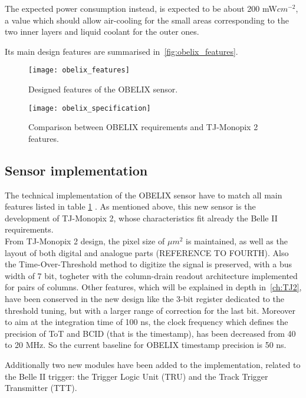 The expected power consumption instead, is expected to be about 200 mW$cm^{-2}$, a value which should allow air-cooling for the small areas corresponding to the two inner layers and liquid coolant for the outer ones. 

Its main design features are summarised in~\autoref{fig:obelix_features}.


\begin{figure}[h!]
\centering
\texttt{[image: obelix\_features]}
\caption{Designed features of the OBELIX sensor.}
\label{fig:obelix_features}
\end{figure}

\begin{figure}[h!]
\centering
\texttt{[image: obelix\_specification]}
\caption{Comparison between OBELIX requirements and TJ-Monopix 2 features.}
\label{fig:obelix_specification}
\end{figure}

\subsection{Sensor implementation}

The technical implementation of the OBELIX sensor have to match all main features listed in table \ref{fig:obelix_features} .
As mentioned above, this new sensor is the development of TJ-Monopix 2, whose characteristics fit already the Belle II requirements.\\

From TJ-Monopix 2 design, the pixel size of  $\mu m^{2}$ is maintained, as well as the layout of both digital and analogue parts (REFERENCE TO FOURTH). Also the Time-Over-Threshold method to digitize the signal is preserved, with a bus width of 7 bit, togheter with the column-drain readout architecture implemented for pairs of columns. Other features, which will be explained in depth in~\autoref{ch:TJ2}, have been conserved in the new design like the 3-bit register dedicated to the threshold tuning, but with a larger range of correction for the last bit. 
Moreover to aim at the integration time of 100 ns, the clock frequency which defines the precision of ToT and BCID (that is the timestamp), has been decreased from 40 to 20 MHz. So the current baseline for OBELIX timestamp precision is 50 ns.

Additionally two new modules have been added to the implementation, related to the Belle II trigger: the Trigger Logic Unit (TRU) and the Track Trigger Transmitter (TTT). 

